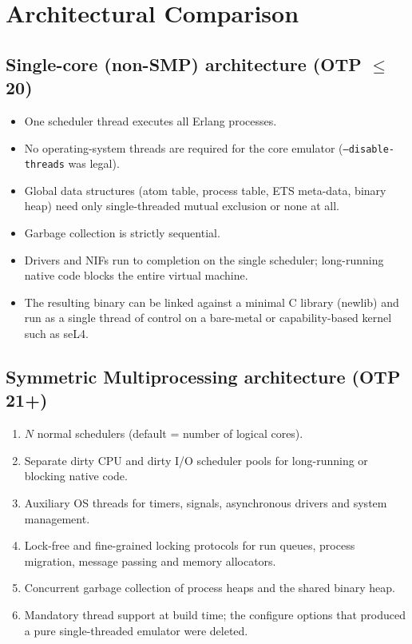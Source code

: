 \documentclass{article}
\begin{document}
\section{Architectural Comparison}

\subsection{Single-core (non-SMP) architecture (OTP $\leq$ 20)}

\begin{itemize}
  \item One scheduler thread executes all Erlang processes.
  \item No operating-system threads are required for the core emulator (\texttt{--disable-threads} was legal).
  \item Global data structures (atom table, process table, ETS meta-data, binary heap) need only single-threaded mutual exclusion or none at all.
  \item Garbage collection is strictly sequential.
  \item Drivers and NIFs run to completion on the single scheduler; long-running native code blocks the entire virtual machine.
  \item The resulting binary can be linked against a minimal C library (newlib) and run as a single thread of control on a bare-metal or capability-based kernel such as seL4.
\end{itemize}

\subsection{Symmetric Multiprocessing architecture (OTP 21+)}

\begin{enumerate}
  \item $N$ normal schedulers (default = number of logical cores).
  \item Separate dirty CPU and dirty I/O scheduler pools for long-running or blocking native code.
  \item Auxiliary OS threads for timers, signals, asynchronous drivers and system management.
  \item Lock-free and fine-grained locking protocols for run queues, process migration, message passing and memory allocators.
  \item Concurrent garbage collection of process heaps and the shared binary heap.
  \item Mandatory thread support at build time; the configure options that produced a pure single-threaded emulator were deleted.
\end{enumerate}
\end{document}
